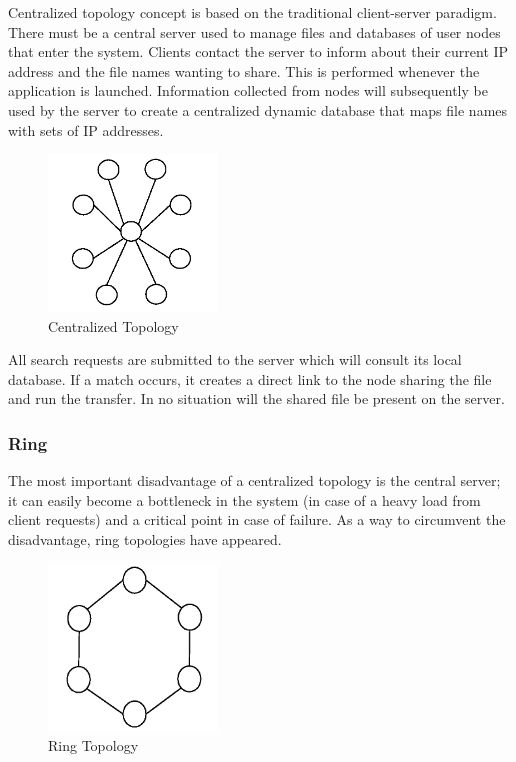 Centralized topology concept is based on the traditional client-server
paradigm. There must be a central server used to manage files and databases
of user nodes that enter the system. Clients contact the server to
inform about their current IP address and the file names wanting to share.
This is performed whenever the application is launched. Information collected
from nodes will subsequently be used by the server to create a centralized
dynamic database that maps file names with sets of IP addresses.

\begin{figure}
  \centering
  \includegraphics[width=0.4\textwidth]{src/img/p2p-systems/centralized}
  \caption{Centralized Topology}
  \label{fig:p2p-systems:centralized}
\end{figure}

All search requests are submitted to the server which will consult its local
database. If a match occurs, it creates a direct link to the node sharing the
file and run the transfer. In no situation will the shared file be present on
the server.

\subsubsection{Ring}

The most important disadvantage of a centralized topology is the central
server; it can easily become a bottleneck in the system (in case of a heavy
load from client requests) and a critical point in case of failure. As a way
to circumvent the disadvantage, ring topologies have appeared.

\begin{figure}
  \centering
  \includegraphics[width=0.4\textwidth]{src/img/p2p-systems/ring}
  \caption{Ring Topology}
  \label{fig:p2p-systems:ring}
\end{figure}

